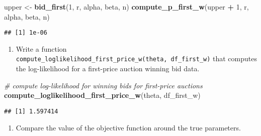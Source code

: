 \documentclass[
]{book}
\newenvironment{Shaded}{\begin{snugshade}}{\end{snugshade}}
\newcommand{\CommentTok}[1]{\textcolor[rgb]{0.56,0.35,0.01}{\textit{#1}}}
\newcommand{\DecValTok}[1]{\textcolor[rgb]{0.00,0.00,0.81}{#1}}
\newcommand{\KeywordTok}[1]{\textcolor[rgb]{0.13,0.29,0.53}{\textbf{#1}}}
\newcommand{\NormalTok}[1]{#1}
\newcommand{\OperatorTok}[1]{\textcolor[rgb]{0.81,0.36,0.00}{\textbf{#1}}}
\newcommand{\StringTok}[1]{\textcolor[rgb]{0.31,0.60,0.02}{#1}}
\providecommand{\tightlist}{%
  \setlength{\itemsep}{0pt}\setlength{\parskip}{0pt}}
\begin{document}
\begin{Shaded}
\begin{Highlighting}[]
\NormalTok{upper <-}\StringTok{ }\KeywordTok{bid_first}\NormalTok{(}\DecValTok{1}\NormalTok{, r, alpha, beta, n)}
\KeywordTok{compute_p_first_w}\NormalTok{(upper }\OperatorTok{+}\StringTok{ }\DecValTok{1}\NormalTok{, r, alpha, beta, n)}
\end{Highlighting}
\end{Shaded}

\begin{verbatim}
## [1] 1e-06
\end{verbatim}

\begin{enumerate}
\def\labelenumi{\arabic{enumi}.}
\setcounter{enumi}{6}
\tightlist
\item
  Write a function \texttt{compute\_loglikelihood\_first\_price\_w(theta,\ df\_first\_w)} that computes the log-likelihood for a first-price auction winning bid data.
\end{enumerate}

\begin{Shaded}
\begin{Highlighting}[]
\CommentTok{# compute log-likelihood for winning bids for first-price auctions}
\KeywordTok{compute_loglikelihood_first_price_w}\NormalTok{(theta, df_first_w)}
\end{Highlighting}
\end{Shaded}

\begin{verbatim}
## [1] 1.597414
\end{verbatim}

\begin{enumerate}
\def\labelenumi{\arabic{enumi}.}
\setcounter{enumi}{7}
\tightlist
\item
  Compare the value of the objective function around the true parameters.
\end{enumerate}
\end{document}
